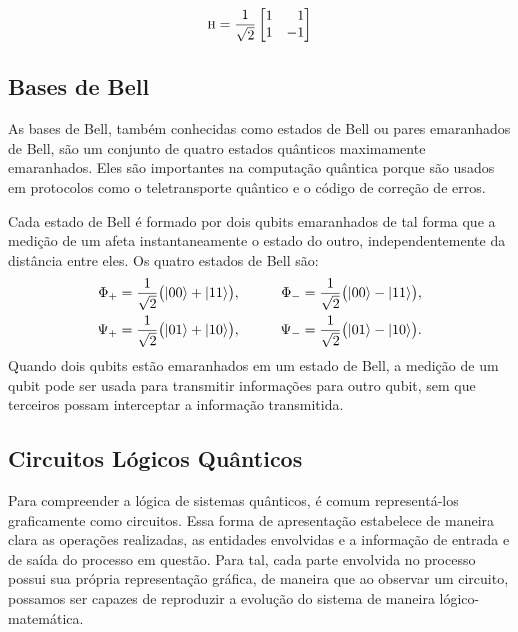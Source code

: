 \begin{equation}
\HAD= \frac{1}{\sqrt{2}} \begin{bmatrix*}[r]
1 & 1 \\
1 & -1
\end{bmatrix*}
\end{equation}

\subsection{Bases de Bell}\label{sec:bell}
As bases de Bell, também conhecidas como estados de Bell ou pares emaranhados de Bell, são um conjunto de quatro estados quânticos maximamente emaranhados. Eles são importantes na computação quântica porque são usados em protocolos como o teletransporte quântico e o código de correção de erros.

Cada estado de Bell é formado por dois qubits emaranhados de tal forma que a medição de um afeta instantaneamente o estado do outro, independentemente da distância entre eles. Os quatro estados de Bell são:
\begin{equation}
  \begin{aligned}
    \Phi_+ &= \frac{1}{\sqrt{2}} \bigl(\ket{00} + \ket{11} \bigr), & \qquad \Phi_- &= \frac{1}{\sqrt{2}} \bigl(\ket{00} - \ket{11} \bigr), \\
    \Psi_+ &= \frac{1}{\sqrt{2}} \bigl(\ket{01} + \ket{10} \bigr), & \qquad \Psi_- &= \frac{1}{\sqrt{2}} \bigl(\ket{01} - \ket{10} \bigr). \\
  \end{aligned}
\end{equation}
Quando dois qubits estão emaranhados em um estado de Bell, a medição de um qubit pode ser usada para transmitir informações para outro qubit, sem que terceiros possam interceptar a informação transmitida.

\subsection{Circuitos Lógicos Quânticos}\label{sec:circuitos}

Para compreender a lógica de sistemas quânticos, é comum representá-los graficamente como circuitos. Essa forma de apresentação estabelece de maneira clara as operações realizadas, as entidades envolvidas e a informação de entrada e de saída do processo em questão. Para tal, cada parte envolvida no processo possui sua própria representação gráfica, de maneira que ao observar um circuito, possamos ser capazes de reproduzir a evolução do sistema de maneira lógico-matemática.

